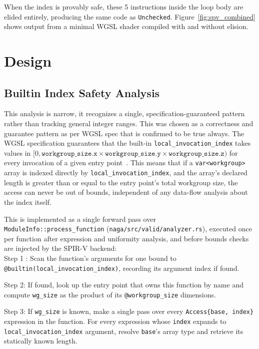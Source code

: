 \documentclass[11pt,a4paper]{article}
\begin{document}
When the index is provably safe, these 5 instructions inside the
loop body are elided entirely, producing the same code as
\texttt{Unchecked}. Figure~\ref{fig:spv_combined}
shows output from a minimal WGSL shader compiled with and without elision.

\section{Design}
\label{sec:design}

\subsection{Builtin Index Safety Analysis}
\label{sec:interval}

This analysis is  narrow, it recognizes a single,
specification-guaranteed pattern rather than tracking general integer ranges. This was chosen  as a correctness and guarantee pattern as per WGSL spec that is confirmed to be true always.
The WGSL specification guarantees that the built-in
\texttt{local\_invocation\_index} takes values in
$[0, \texttt{workgroup\_size.x} \times \texttt{workgroup\_size.y} \times
\texttt{workgroup\_size.z})$ for every invocation of a given entry
point~\cite{wgsl_spec}. This means that if a \texttt{var<workgroup>} array is
indexed directly by \texttt{local\_invocation\_index}, and the array's
declared length is greater than or equal to the entry point's total workgroup
size, the access can never be out of bounds, independent of any data-flow
analysis  about the index  itself.

This is implemented as a single forward pass over
\texttt{ModuleInfo::process\_function} (\texttt{naga/src/valid/analyzer.rs}),
executed once per function after expression and uniformity analysis, and
before bounds checks are injected by the SPIR-V backend:
\\
Step 1 : Scan the function's arguments for one bound to
  \texttt{@builtin(local\_invocation\_index)}, recording its argument index if
  found.

Step 2: If found, look up the entry point that owns this function by name and
  compute \texttt{wg\_size} as the product of its \texttt{@workgroup\_size}
  dimensions.

Step 3: If \texttt{wg\_size} is known, make a single pass over every
  \texttt{Access\{base, index\}} expression in the function. For every expression whose \texttt{index} expands to
  \texttt{local\_invocation\_index} argument, resolve \texttt{base}'s array
  type and retrieve its statically
  known length.
\end{document}
